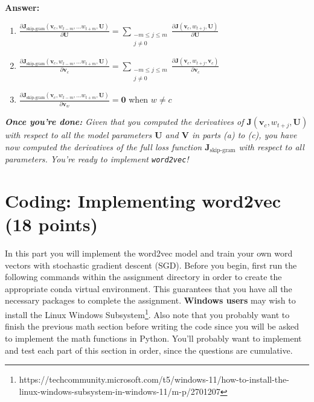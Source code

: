 \documentclass{article}
\newenvironment{answer}{
    {\bf Answer:} \sf \begingroup\color{red}
}{\endgroup}%
\begin{document}
\begin{enumerate}[label=(\alph*)]
\begin{shaded}
\begin{answer}
\begin{enumerate}[label=(\roman*)]
    \item $\frac{\partial \bm J_{\textrm{skip-gram}}(\bm v_c, w_{t-m},\ldots w_{t+m}, \bm U)} {\partial \bm U} = \sum_{\substack{-m\le j \le m \\ j\ne 0}} \frac{\partial \bm J(\bm v_c, w_{t+j}, \bm U)}{\partial \bm U}$
    \item $\frac{\partial \bm J_{\textrm{skip-gram}}(\bm v_c, w_{t-m},\ldots w_{t+m}, \bm U)} {\partial \bm v_c} = \sum_{\substack{-m\le j \le m \\ j\ne 0}} \frac{\partial \bm J(\bm v_c, w_{t+j}, \bm v_c)}{\partial \bm v_c}$
    \item $\frac{\partial \bm J_{\textrm{skip-gram}}(\bm v_c, w_{t-m},\ldots w_{t+m}, \bm U)} {\partial \bm v_w} = \bm 0$ when $w \ne c$
\end{enumerate}
\end{answer}
\end{shaded}

\textit{\textbf{Once you're done:} Given that you computed the derivatives of $\bm J(\bm v_c, w_{t+j}, \bm U)$ with respect to all the model parameters $\bm U$ and $\bm V$ in parts (a) to (c), you have now computed the derivatives of the full loss function $\bm J_{\text{skip-gram}}$ with respect to all parameters. You're ready to implement \texttt{word2vec}!} %

\end{enumerate}

\section{Coding: Implementing word2vec (18 points)}
In this part you will implement the word2vec model and train your own word vectors with stochastic gradient descent (SGD). Before you begin, first run the following commands within the assignment directory in order to create the appropriate conda virtual environment. This guarantees that you have all the necessary packages to complete the assignment. \textbf{Windows users} may wish to install the Linux Windows Subsystem\footnote{https://techcommunity.microsoft.com/t5/windows-11/how-to-install-the-linux-windows-subsystem-in-windows-11/m-p/2701207}. Also note that you probably want to finish the previous math section before writing the code since you will be asked to implement the math functions in Python. You’ll probably want to implement and test each part of this section in order, since the questions are cumulative.
\end{document}
